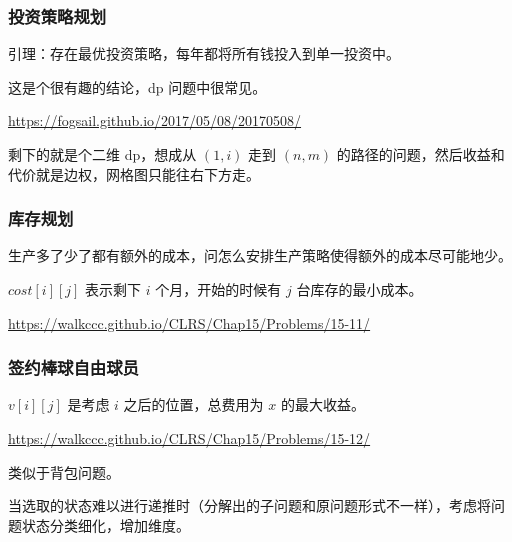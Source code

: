 \subsubsection{投资策略规划}

\begin{QUOTE}{}{}
引理：存在最优投资策略，每年都将所有钱投入到单一投资中。
\end{QUOTE}

这是个很有趣的结论，dp 问题中很常见。

\url{https://fogsail.github.io/2017/05/08/20170508/}

剩下的就是个二维 dp，想成从 $(1, i)$ 走到 $(n, m)$ 的路径的问题，然后收益和代价就是边权，网格图只能往右下方走。

\subsubsection{库存规划}

生产多了少了都有额外的成本，问怎么安排生产策略使得额外的成本尽可能地少。

$cost[i][j]$ 表示剩下 $i$ 个月，开始的时候有 $j$ 台库存的最小成本。

\url{https://walkccc.github.io/CLRS/Chap15/Problems/15-11/}

\subsubsection{签约棒球自由球员}

$v[i][j]$ 是考虑 $i$ 之后的位置，总费用为 $x$ 的最大收益。

\url{https://walkccc.github.io/CLRS/Chap15/Problems/15-12/}

类似于背包问题。

\hr

当选取的状态难以进行递推时（分解出的子问题和原问题形式不一样），考虑将问题状态分类细化，增加维度。

